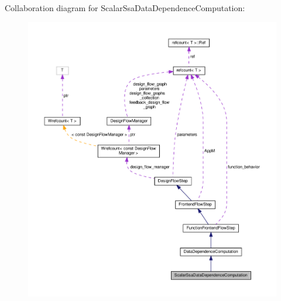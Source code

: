Collaboration diagram for Scalar\+Ssa\+Data\+Dependence\+Computation\+:
\nopagebreak
\begin{figure}[H]
\begin{center}
\leavevmode
\includegraphics[width=350pt]{d8/d2b/classScalarSsaDataDependenceComputation__coll__graph}
\end{center}
\end{figure}
